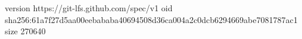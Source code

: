 version https://git-lfs.github.com/spec/v1
oid sha256:61a7f27d5aa00eebababa40694508d36ca004a2c0dcb6294669abe7081787ac1
size 270640
